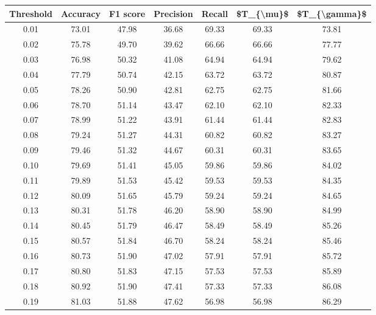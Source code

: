 \begin{tabular}{|c|c|c|c|c|c|c|}
\hline
 Threshold &  Accuracy &  F1 score &  Precision &  Recall &  \$T\_\{\textbackslash mu\}\$ &  \$T\_\{\textbackslash gamma\}\$ \\
\hline
      0.01 &     73.01 &     47.98 &      36.68 &   69.33 &      69.33 &         73.81 \\
      0.02 &     75.78 &     49.70 &      39.62 &   66.66 &      66.66 &         77.77 \\
      0.03 &     76.98 &     50.32 &      41.08 &   64.94 &      64.94 &         79.62 \\
      0.04 &     77.79 &     50.74 &      42.15 &   63.72 &      63.72 &         80.87 \\
      0.05 &     78.26 &     50.90 &      42.81 &   62.75 &      62.75 &         81.66 \\
      0.06 &     78.70 &     51.14 &      43.47 &   62.10 &      62.10 &         82.33 \\
      0.07 &     78.99 &     51.22 &      43.91 &   61.44 &      61.44 &         82.83 \\
      0.08 &     79.24 &     51.27 &      44.31 &   60.82 &      60.82 &         83.27 \\
      0.09 &     79.46 &     51.32 &      44.67 &   60.31 &      60.31 &         83.65 \\
      0.10 &     79.69 &     51.41 &      45.05 &   59.86 &      59.86 &         84.02 \\
      0.11 &     79.89 &     51.53 &      45.42 &   59.53 &      59.53 &         84.35 \\
      0.12 &     80.09 &     51.65 &      45.79 &   59.24 &      59.24 &         84.65 \\
      0.13 &     80.31 &     51.78 &      46.20 &   58.90 &      58.90 &         84.99 \\
      0.14 &     80.45 &     51.79 &      46.47 &   58.49 &      58.49 &         85.26 \\
      0.15 &     80.57 &     51.84 &      46.70 &   58.24 &      58.24 &         85.46 \\
      0.16 &     80.73 &     51.90 &      47.02 &   57.91 &      57.91 &         85.72 \\
      0.17 &     80.80 &     51.83 &      47.15 &   57.53 &      57.53 &         85.89 \\
      0.18 &     80.92 &     51.90 &      47.41 &   57.33 &      57.33 &         86.08 \\
      0.19 &     81.03 &     51.88 &      47.62 &   56.98 &      56.98 &         86.29 \\

\end{tabular}
